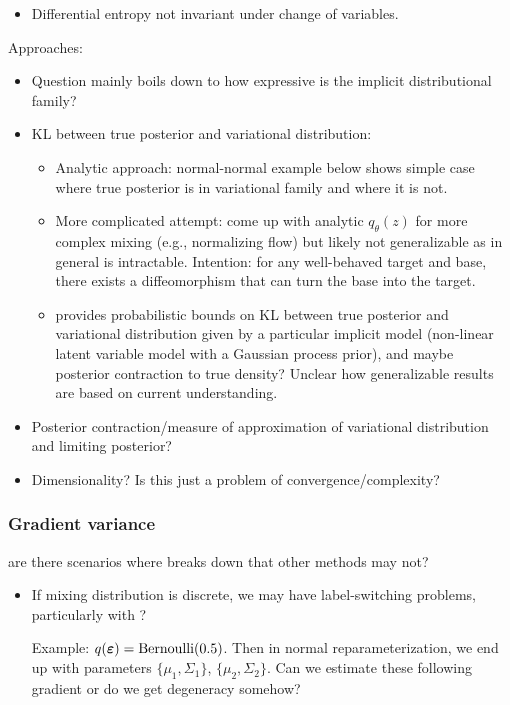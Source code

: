 \documentclass[10pt]{article}
\begin{document}
\begin{itemize}
\begin{itemize}
\item
Differential entropy not invariant under change of variables.

\end{itemize}
\end{itemize}

Approaches:
\begin{itemize}

\item
Question mainly boils down to how expressive is the implicit distributional family?

\item
KL between true posterior and variational distribution:
\begin{itemize}
\item
Analytic approach: normal-normal example below shows simple case where true posterior is in variational family and where it is not.
\item
More complicated attempt: come up with analytic $q_\theta(z)$ for more complex mixing (e.g., normalizing flow) but likely not generalizable as in general is intractable. Intention: for any well-behaved target and base, there exists a diffeomorphism that can turn the base into the target.
\item
\citet{Plummer:2021} provides probabilistic bounds on KL between true posterior and variational distribution given by a particular implicit model (non-linear latent variable model with a Gaussian process prior), and maybe posterior contraction to true density? Unclear how generalizable results are based on current understanding.
\end{itemize}

\item
Posterior contraction/measure of approximation of variational distribution and limiting posterior?

\item
Dimensionality? Is this just a problem of convergence/complexity?

\end{itemize}


\subsubsection{Gradient variance}

\todo are there scenarios where \uivi breaks down that other \vi methods may not?

\begin{itemize}

\item
If mixing distribution is discrete, we may have label-switching problems, particularly with \mcmc? \citep{Chung:2004}

Example: $q(\bm{\varepsilon})=\mathrm{Bernoulli}(0.5)$. Then in normal reparameterization, we end up with parameters $\{\mu_1,\Sigma_1\}$, $\{\mu_2,\Sigma_2\}$. Can we estimate these following \elbo gradient or do we get degeneracy somehow?

\end{itemize}
\end{document}
